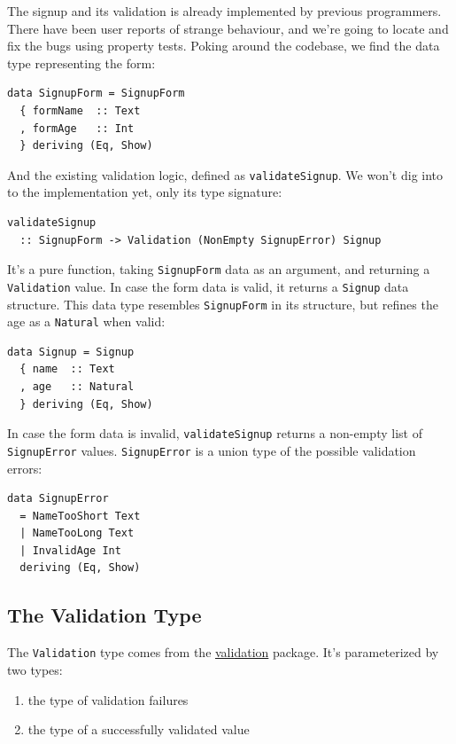 \vspace{0.8\baselineskip}


\noindent The signup and its validation is already implemented by previous
programmers. There have been user reports of strange behaviour, and
we're going to locate and fix the bugs using property tests.
Poking around the codebase, we find the data type representing the form:

\begin{verbatim}
data SignupForm = SignupForm
  { formName  :: Text
  , formAge   :: Int
  } deriving (Eq, Show)
\end{verbatim}
And the existing validation logic, defined as \texttt{validateSignup}.
We won't dig into to the implementation yet, only its type signature:

\begin{verbatim}
validateSignup
  :: SignupForm -> Validation (NonEmpty SignupError) Signup
\end{verbatim}
It's a pure function, taking \texttt{SignupForm} data as an argument,
and returning a \texttt{Validation} value. In case the form data is
valid, it returns a \texttt{Signup} data structure. This data type
resembles \texttt{SignupForm} in its structure, but refines the age as a
\texttt{Natural} when valid:

\begin{verbatim}
data Signup = Signup
  { name  :: Text
  , age   :: Natural
  } deriving (Eq, Show)
\end{verbatim}
In case the form data is invalid, \texttt{validateSignup} returns a
non-empty list of \texttt{SignupError} values. \texttt{SignupError} is a
union type of the possible validation errors:

\begin{verbatim}
data SignupError
  = NameTooShort Text
  | NameTooLong Text
  | InvalidAge Int
  deriving (Eq, Show)
\end{verbatim}



\subsection{The Validation Type}\label{the-validation-type}

The \texttt{Validation} type comes from the
\href{https://hackage.haskell.org/package/validation}{validation}
package. It's parameterized by two types:

\begin{enumerate}
\def\labelenumi{\arabic{enumi}.}

\item
  the type of validation failures
\item
  the type of a successfully validated value
\end{enumerate}

